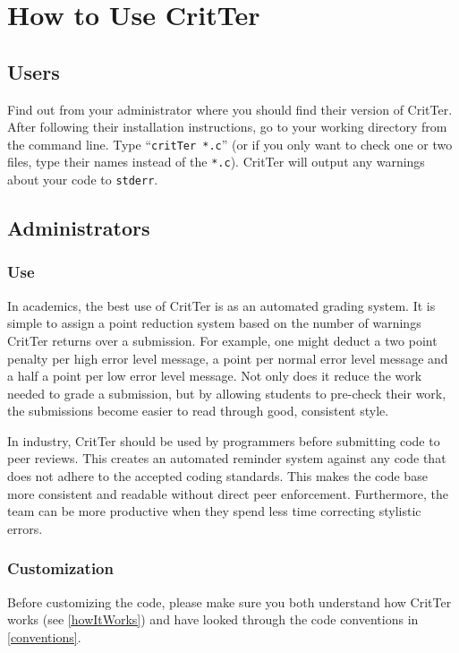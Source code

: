 \documentclass[12pt]{report}
\newcommand{\programName}{CritTer\xspace}
\begin{document}
\chapter{How to Use \programName}

\section{Users}
Find out from your administrator where you should find their version of \programName. After following 
their installation instructions, go to your working directory from the command line. Type 
``\lstinline{critTer *.c}'' (or if you only want to check one or two files, type their names instead of the 
\lstinline{*.c}). \programName will output any warnings about your code to \lstinline{stderr}.

\section{Administrators}

\subsection{Use}
In academics, the best use of \programName is as an automated grading system. It is simple to assign a 
point reduction system based on the number of warnings \programName returns over a submission. For 
example, one might deduct a two point penalty per high error level message, a point per normal error 
level message and a half a point per low error level message. Not only does it reduce the work needed 
to grade a submission, but by allowing students to pre-check their work, the submissions become easier 
to read through good, consistent style.

In industry, \programName should be used by programmers before submitting code to peer reviews. This 
creates an automated reminder system against any code that does not adhere to the accepted coding 
standards. This makes the code base more consistent and readable without direct peer enforcement. 
Furthermore, the team can be more productive when they spend less time correcting stylistic errors.

\subsection{Customization}
Before customizing the code, please make sure you both understand how \programName works (see 
\autoref{howItWorks}) and have looked through the code conventions in \autoref{conventions}.
\end{document}
